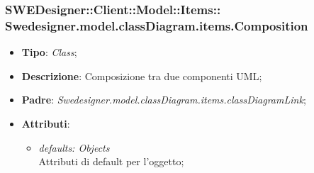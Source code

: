 \documentclass[../DefinizioneDiProdotto.tex]{subfiles}
\begin{document}
			\subsubsection[Swedesigner.model.classDiagram.items.Composition]{SWEDesigner::Client::Model::Items::\\Swedesigner.model.classDiagram.items.Composition}
			\hypertarget{SWEDesigner::Client::Model::Items::Swedesigner.model.classDiagram.items.Composition}{}
			\begin{itemize}
				\item \textbf{Tipo}: \emph{Class};
				\item \textbf{Descrizione}: Composizione tra due componenti UML;
				\item \textbf{Padre}: \emph{Swedesigner.model.classDiagram.items.classDiagramLink};
				\item \textbf{Attributi}:
				\begin{itemize}
					\item \emph{defaults: Objects}\\
					Attributi di default per l'oggetto;
				\end{itemize}
			\end{itemize}
\end{document}
